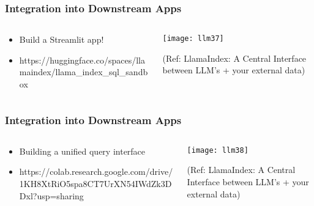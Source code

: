 \begin{frame}[fragile]\frametitle{Integration into Downstream Apps}

\begin{columns}
    \begin{column}[T]{0.4\linewidth}
		\begin{itemize}
		\item Build a Streamlit app! 
		\item https://huggingface.co/spaces/llamaindex/llama\_index\_sql\_sandbox
		\end{itemize}	
    \end{column}
    \begin{column}[T]{0.6\linewidth}
		\begin{center}
		\texttt{[image: llm37]}

		{\tiny (Ref: LlamaIndex: A Central Interface between LLM’s + your external data)}
		\end{center}
    \end{column}
  \end{columns}
\end{frame}

\begin{frame}[fragile]\frametitle{Integration into Downstream Apps}

\begin{columns}
    \begin{column}[T]{0.4\linewidth}
		\begin{itemize}
		\item Building a unified query interface
		\item https://colab.research.google.com/drive/
		1KH8XtRiO5spa8CT7UrXN54IWdZk3DDxl?usp=sharing
		\end{itemize}	
    \end{column}
    \begin{column}[T]{0.6\linewidth}
		\begin{center}
		\texttt{[image: llm38]}

		{\tiny (Ref: LlamaIndex: A Central Interface between LLM’s + your external data)}
		\end{center}
    \end{column}
  \end{columns}
\end{frame}
